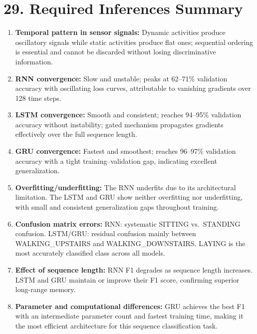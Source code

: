\documentclass[10pt]{article}
\begin{document}
\section*{29. Required Inferences Summary}

\begin{enumerate}
\item \textbf{Temporal pattern in sensor signals:} Dynamic activities produce
oscillatory signals while static activities produce flat ones; sequential
ordering is essential and cannot be discarded without losing discriminative information.

\item \textbf{RNN convergence:} Slow and unstable; peaks at 62--71\% validation
accuracy with oscillating loss curves, attributable to vanishing gradients over
128 time steps.

\item \textbf{LSTM convergence:} Smooth and consistent; reaches 94--95\%
validation accuracy without instability; gated mechanism propagates gradients
effectively over the full sequence length.

\item \textbf{GRU convergence:} Fastest and smoothest; reaches 96--97\%
validation accuracy with a tight training--validation gap, indicating excellent
generalization.

\item \textbf{Overfitting/underfitting:} The RNN underfits due to its architectural
limitation. The LSTM and GRU show neither overfitting nor underfitting, with
small and consistent generalization gaps throughout training.

\item \textbf{Confusion matrix errors:} RNN: systematic SITTING vs.\ STANDING
confusion. LSTM/GRU: residual confusion mainly between WALKING\_UPSTAIRS and
WALKING\_DOWNSTAIRS. LAYING is the most accurately classified class across all
models.

\item \textbf{Effect of sequence length:} RNN F1 degrades as sequence length
increases. LSTM and GRU maintain or improve their F1 score, confirming superior
long-range memory.

\item \textbf{Parameter and computational differences:} GRU achieves the best
F1 with an intermediate parameter count and fastest training time, making it the
most efficient architecture for this sequence classification task.


\end{enumerate}
\end{document}
